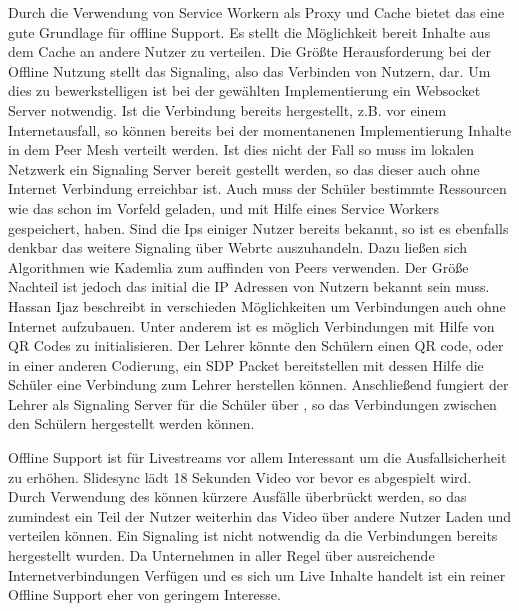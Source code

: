 Durch die Verwendung von Service Workern als Proxy und Cache bietet das \cdn eine gute Grundlage für offline Support. Es stellt die Möglichkeit bereit Inhalte aus dem Cache an andere Nutzer zu verteilen. Die Größte Herausforderung bei der Offline Nutzung stellt das Signaling, also das Verbinden von Nutzern, dar. Um dies zu bewerkstelligen ist bei der gewählten Implementierung ein Websocket Server notwendig. Ist die Verbindung bereits hergestellt, z.B. vor einem Internetausfall, so können bereits bei der momentanenen Implementierung Inhalte in dem Peer Mesh verteilt werden. Ist dies nicht der Fall so muss im lokalen Netzwerk ein Signaling Server bereit gestellt werden, so das dieser auch ohne Internet Verbindung erreichbar ist. Auch muss der Schüler bestimmte Ressourcen wie das \pTp \cdn schon im Vorfeld geladen, und mit Hilfe eines Service Workers gespeichert, haben. Sind die Ips einiger Nutzer bereits bekannt, so ist es ebenfalls denkbar das weitere Signaling über Webrtc auszuhandeln. Dazu ließen sich Algorithmen wie Kademlia zum auffinden von Peers verwenden. Der Größe Nachteil ist jedoch das initial die IP Adressen von Nutzern bekannt sein muss. Hassan Ijaz\cite{signaling_no_i_patent} beschreibt in verschieden Möglichkeiten um \webrtc Verbindungen auch ohne Internet aufzubauen. Unter anderem ist es möglich \webrtc Verbindungen mit Hilfe von QR Codes zu initialisieren. Der Lehrer könnte den Schülern einen QR code, oder in einer anderen Codierung, ein SDP Packet bereitstellen mit dessen Hilfe die Schüler eine \webrtc Verbindung zum Lehrer herstellen können. Anschließend fungiert der Lehrer als Signaling Server für die Schüler über \webrtc, so das Verbindungen zwischen den Schülern hergestellt werden können.

Offline Support ist für Livestreams vor allem Interessant um die Ausfallsicherheit zu erhöhen. Slidesync lädt 18 Sekunden Video vor bevor es abgespielt wird. Durch Verwendung des \pTp \cdn können kürzere Ausfälle überbrückt werden, so das zumindest ein Teil der Nutzer weiterhin das Video über andere Nutzer Laden und verteilen können. Ein Signaling ist nicht notwendig da die Verbindungen bereits hergestellt wurden. Da Unternehmen in aller Regel über ausreichende Internetverbindungen Verfügen und es sich um Live Inhalte handelt ist ein reiner Offline Support eher von geringem Interesse. 

